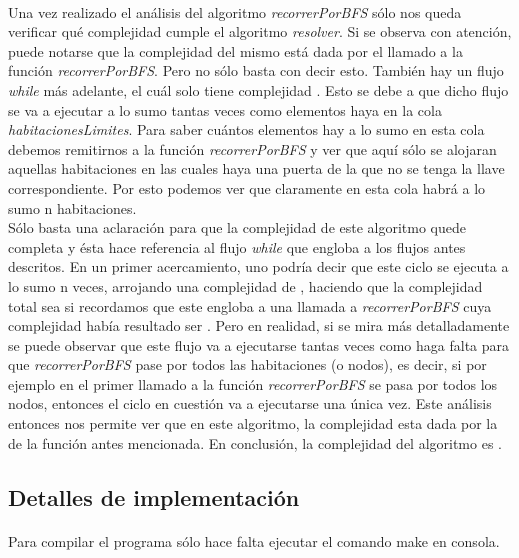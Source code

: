\paragraph{}
Una vez realizado el análisis del algoritmo \textit{recorrerPorBFS} sólo nos queda verificar qué complejidad cumple el algoritmo \textit{resolver}. Si se observa con atención, puede notarse que la complejidad del mismo está dada por el llamado a la función \textit{recorrerPorBFS}. Pero no sólo basta con decir esto. También hay un flujo \textit{while} más adelante, el cuál solo tiene complejidad . Esto se debe a que dicho flujo se va a ejecutar a lo sumo tantas veces como elementos haya en la cola \textit{habitacionesLimites}. Para saber cuántos elementos hay a lo sumo en esta cola debemos remitirnos a la función \textit{recorrerPorBFS} y ver que aquí sólo se alojaran aquellas habitaciones en las cuales haya una puerta de la que no se tenga la llave correspondiente. Por esto podemos ver que claramente en esta cola habrá a lo sumo n habitaciones.\\
Sólo basta una aclaración para que la complejidad de este algoritmo quede completa y ésta hace referencia al flujo \textit{while} que engloba a los flujos antes descritos. En un primer acercamiento, uno podría decir que este ciclo se ejecuta a lo sumo n veces, arrojando una complejidad de , haciendo que la complejidad total sea  si recordamos que este engloba a una llamada a \textit{recorrerPorBFS} cuya complejidad había resultado ser . Pero en realidad, si se mira más detalladamente se puede observar que este flujo va a ejecutarse tantas veces como haga falta para que \textit{recorrerPorBFS} pase por todos las habitaciones (o nodos), es decir, si por ejemplo en el primer llamado a la función \textit{recorrerPorBFS} se pasa por todos los nodos, entonces el ciclo en cuestión va a ejecutarse una única vez. Este análisis entonces nos permite ver que en este algoritmo, la complejidad esta dada por la de la función antes mencionada. En conclusión, la complejidad del algoritmo es .

\subsection{Detalles de implementación}

\paragraph{}
Para compilar el programa sólo hace falta ejecutar el comando make en consola.

